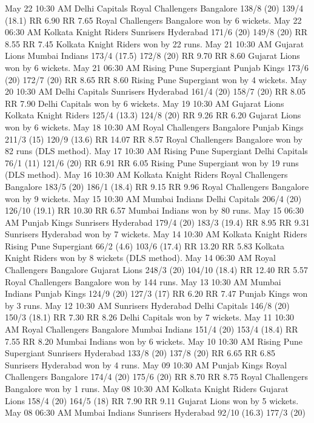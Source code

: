 May 22
10:30 AM
Delhi Capitals
Royal Challengers Bangalore
138/8 (20)
139/4 (18.1)
RR 6.90
RR 7.65
Royal Challengers Bangalore won by 6 wickets.
May 22
06:30 AM
Kolkata Knight Riders
Sunrisers Hyderabad
171/6 (20)
149/8 (20)
RR 8.55
RR 7.45
Kolkata Knight Riders won by 22 runs.
May 21
10:30 AM
Gujarat Lions
Mumbai Indians
173/4 (17.5)
172/8 (20)
RR 9.70
RR 8.60
Gujarat Lions won by 6 wickets.
May 21
06:30 AM
Rising Pune Supergiant
Punjab Kings
173/6 (20)
172/7 (20)
RR 8.65
RR 8.60
Rising Pune Supergiant won by 4 wickets.
May 20
10:30 AM
Delhi Capitals
Sunrisers Hyderabad
161/4 (20)
158/7 (20)
RR 8.05
RR 7.90
Delhi Capitals won by 6 wickets.
May 19
10:30 AM
Gujarat Lions
Kolkata Knight Riders
125/4 (13.3)
124/8 (20)
RR 9.26
RR 6.20
Gujarat Lions won by 6 wickets.
May 18
10:30 AM
Royal Challengers Bangalore
Punjab Kings
211/3 (15)
120/9 (13.6)
RR 14.07
RR 8.57
Royal Challengers Bangalore won by 82 runs (DLS method).
May 17
10:30 AM
Rising Pune Supergiant
Delhi Capitals
76/1 (11)
121/6 (20)
RR 6.91
RR 6.05
Rising Pune Supergiant won by 19 runs (DLS method).
May 16
10:30 AM
Kolkata Knight Riders
Royal Challengers Bangalore
183/5 (20)
186/1 (18.4)
RR 9.15
RR 9.96
Royal Challengers Bangalore won by 9 wickets.
May 15
10:30 AM
Mumbai Indians
Delhi Capitals
206/4 (20)
126/10 (19.1)
RR 10.30
RR 6.57
Mumbai Indians won by 80 runs.
May 15
06:30 AM
Punjab Kings
Sunrisers Hyderabad
179/4 (20)
183/3 (19.4)
RR 8.95
RR 9.31
Sunrisers Hyderabad won by 7 wickets.
May 14
10:30 AM
Kolkata Knight Riders
Rising Pune Supergiant
66/2 (4.6)
103/6 (17.4)
RR 13.20
RR 5.83
Kolkata Knight Riders won by 8 wickets (DLS method).
May 14
06:30 AM
Royal Challengers Bangalore
Gujarat Lions
248/3 (20)
104/10 (18.4)
RR 12.40
RR 5.57
Royal Challengers Bangalore won by 144 runs.
May 13
10:30 AM
Mumbai Indians
Punjab Kings
124/9 (20)
127/3 (17)
RR 6.20
RR 7.47
Punjab Kings won by 3 runs.
May 12
10:30 AM
Sunrisers Hyderabad
Delhi Capitals
146/8 (20)
150/3 (18.1)
RR 7.30
RR 8.26
Delhi Capitals won by 7 wickets.
May 11
10:30 AM
Royal Challengers Bangalore
Mumbai Indians
151/4 (20)
153/4 (18.4)
RR 7.55
RR 8.20
Mumbai Indians won by 6 wickets.
May 10
10:30 AM
Rising Pune Supergiant
Sunrisers Hyderabad
133/8 (20)
137/8 (20)
RR 6.65
RR 6.85
Sunrisers Hyderabad won by 4 runs.
May 09
10:30 AM
Punjab Kings
Royal Challengers Bangalore
174/4 (20)
175/6 (20)
RR 8.70
RR 8.75
Royal Challengers Bangalore won by 1 runs.
May 08
10:30 AM
Kolkata Knight Riders
Gujarat Lions
158/4 (20)
164/5 (18)
RR 7.90
RR 9.11
Gujarat Lions won by 5 wickets.
May 08
06:30 AM
Mumbai Indians
Sunrisers Hyderabad
92/10 (16.3)
177/3 (20)
